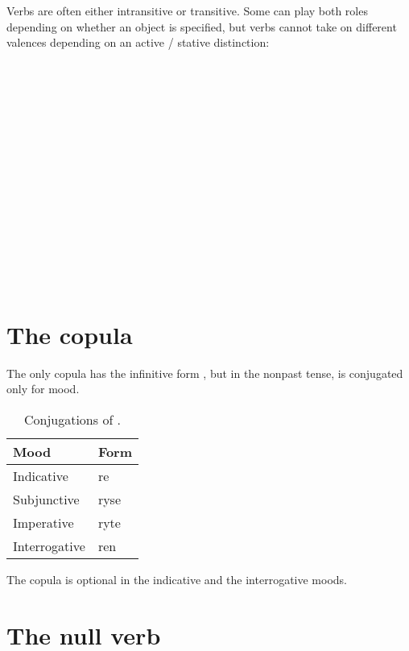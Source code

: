 \documentclass{book}
\begin{document}
Verbs are often either intransitive or transitive. Some can play both roles depending on whether an object is specified, but verbs cannot take on different valences depending on an active / stative distinction: \\
~\\
 \\
 \\
 \\
~\\
  \\
  \\
  \\
~\\
  \\
  \\
  \\
~\\
   \\
   \\
  

\section{The copula}

The only copula has the infinitive form , but in the nonpast tense, is conjugated only for mood.

\begin{table}[h]
  \caption{Conjugations of .}
  \centering
	\begin{tabular}{|l|l|}
		\hline
		Mood & Form \\ \hline
		Indicative & re \\
		Subjunctive & ryse \\
		Imperative & ryte \\
		Interrogative & ren \\ \hline
	\end{tabular}
\end{table}

The copula is optional in the indicative and the interrogative moods.

\section{The null verb}
\end{document}
